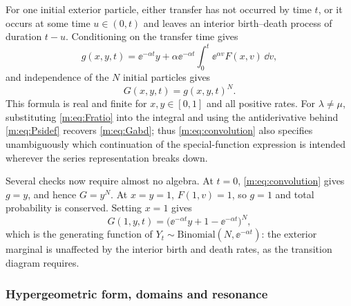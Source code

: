 For one initial exterior particle, either transfer has not occurred by time $t$, or
it occurs at some time $u\in(0,t)$ and leaves an interior birth--death process of
duration $t-u$. Conditioning on the transfer time gives
\begin{equation}
\label{m:eq:convolution}
g(x,y,t) = \ee^{-\alpha t}y + \alpha\ee^{-\alpha t}\int_0^t\ee^{\alpha v}F(x,v)\,\dd v ,
\end{equation}
and independence of the $N$ initial particles gives
\begin{equation}
\label{m:eq:convolutionpower}
G(x,y,t) = g(x,y,t)^N .
\end{equation}
This formula is real and finite for $x,y\in[0,1]$ and all positive rates. For
$\lambda\neq\mu$, substituting \cref{m:eq:Fratio} into the integral and using the
antiderivative behind \cref{m:eq:Psidef} recovers \cref{m:eq:Gabd}; thus
\cref{m:eq:convolution} also specifies unambiguously which continuation of the
special-function expression is intended wherever the series representation breaks
down.

Several checks now require almost no algebra. At $t=0$, \cref{m:eq:convolution}
gives $g=y$, and hence $G=y^N$. At $x=y=1$, $F(1,v)=1$, so $g=1$ and total
probability is conserved. Setting $x=1$ gives
\begin{equation}
\label{m:eq:exteriorbinomial}
G(1,y,t) = \bigl(\ee^{-\alpha t}y + 1-\ee^{-\alpha t}\bigr)^N ,
\end{equation}
which is the generating function of $Y_t\sim\text{Binomial}(N,\ee^{-\alpha t})$:
the exterior marginal is unaffected by the interior birth and death rates, as the
transition diagram requires.

\subsubsection{Hypergeometric form, domains and resonance}

